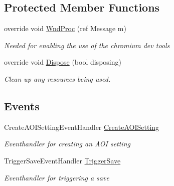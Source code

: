 \subsection*{Protected Member Functions}
\begin{DoxyCompactItemize}
\item 
override void \hyperlink{class_web_analyzer_1_1_u_i_1_1_edit_a_o_i_setting_form_ac3f025da2408c167bf806f47caaebb4b}{Wnd\+Proc} (ref Message m)
\begin{DoxyCompactList}\small\item\em Needed for enabling the use of the chromium dev tools \end{DoxyCompactList}\item 
override void \hyperlink{class_web_analyzer_1_1_u_i_1_1_edit_a_o_i_setting_form_a082405816f59a1c2f6ece128a29dd3eb}{Dispose} (bool disposing)
\begin{DoxyCompactList}\small\item\em Clean up any resources being used. \end{DoxyCompactList}\end{DoxyCompactItemize}
\subsection*{Events}
\begin{DoxyCompactItemize}
\item 
Create\+A\+O\+I\+Setting\+Event\+Handler \hyperlink{class_web_analyzer_1_1_u_i_1_1_edit_a_o_i_setting_form_a1841845af65ba0e224742710ddefb772}{Create\+A\+O\+I\+Setting}
\begin{DoxyCompactList}\small\item\em Eventhandler for creating an A\+O\+I setting \end{DoxyCompactList}\item 
Trigger\+Save\+Event\+Handler \hyperlink{class_web_analyzer_1_1_u_i_1_1_edit_a_o_i_setting_form_a5333229783b91948ba94f0ed0a947c6d}{Trigger\+Save}
\begin{DoxyCompactList}\small\item\em Eventhandler for triggering a save \end{DoxyCompactList}\end{DoxyCompactItemize}
